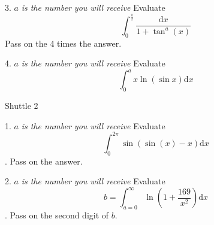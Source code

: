 \documentclass[11pt, a4paper]{article}
\newcommand{\dd}{\mathrm{d}}
\begin{document}
\begin{enumerate}
3. $a$\textit{ is the number you will receive} \newline Evaluate $$\int_0^{\frac{\pi}{2}} \frac{\dd x}{1+\tan^{a}(x)}$$
Pass on the 4 times the answer. \newline  \newline \newline \newline \newline \newline

4. $a$\textit{ is the number you will receive} \newline Evaluate $$\int_0^{a} x\ln(\sin{x}) \dd x$$
\newpage

Shuttle 2

1. $a$\textit{ is the number you will receive} \newline Evaluate $$\int_0^{2 \pi} \sin(\sin(x)-x) \dd x$$. Pass on the answer. \newline  \newline \newline \newline \newline \newline   %

2. $a$\textit{ is the number you will receive} \newline Evaluate $$b=\int_{a=0}^{\infty} \ln(1+\frac{169}{x^2}) \dd x$$. Pass on the second digit of $b$. \newline  \newline \newline \newline \newline \newline 


\end{enumerate}
\end{document}
